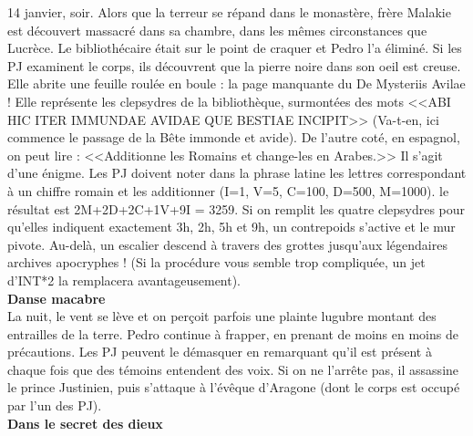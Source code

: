 \documentclass[11pt,twoside,a4paper]{book}
\begin{document}
14 janvier, soir. Alors que la terreur se r{\'e}pand dans le monast{\`e}re, fr{\`e}re Malakie est d{\'e}couvert massacr{\'e} dans sa chambre, dans les m{\^e}mes circonstances que Lucr{\`e}ce. Le biblioth{\'e}caire {\'e}tait sur le point de craquer et Pedro l'a {\'e}limin{\'e}. Si les PJ examinent le corps, ils d{\'e}couvrent que la pierre noire dans son oeil est creuse. Elle abrite une feuille roul{\'e}e en boule : la page manquante du De Mysteriis Avilae ! Elle repr{\'e}sente les clepsydres de la biblioth{\`e}que, surmont{\'e}es des mots <<ABI HIC ITER IMMUNDAE AVIDAE QUE BESTIAE INCIPIT>> (Va-t-en, ici commence le passage de la B{\^e}te immonde et avide). De l'autre cot{\'e}, en espagnol, on peut lire : <<Additionne les Romains et change-les en Arabes.>> Il s'agit d'une {\'e}nigme. Les PJ doivent noter dans la phrase latine les lettres correspondant {\`a} un chiffre romain et les additionner (I=1, V=5, C=100, D=500, M=1000). le r{\'e}sultat est 2M+2D+2C+1V+9I = 3259. Si on remplit les quatre clepsydres pour qu'elles indiquent exactement 3h, 2h, 5h et 9h, un contrepoids s'active et le mur pivote. Au-del{\`a}, un escalier descend {\`a} travers des grottes jusqu'aux l{\'e}gendaires archives apocryphes ! (Si la proc{\'e}dure vous semble trop compliqu{\'e}e, un jet d'INT*2 la remplacera avantageusement).~\\

\textbf{Danse macabre}~\\

La nuit, le vent se l{\`e}ve et on per\c{c}oit parfois une plainte lugubre montant des entrailles de la terre. Pedro continue {\`a} frapper, en prenant de moins en moins de pr{\'e}cautions. Les PJ peuvent le d{\'e}masquer en remarquant qu'il est pr{\'e}sent {\`a} chaque fois que des t{\'e}moins entendent des voix. Si on ne l'arr{\^e}te pas, il assassine le prince Justinien, puis s'attaque {\`a} l'{\'e}v{\^e}que d'Aragone (dont le corps est occup{\'e} par l'un des PJ).~\\

\textbf{\large Dans le secret des dieux}~\\
\end{document}
